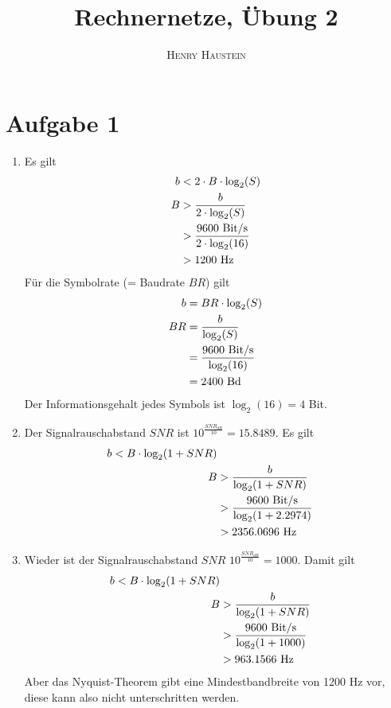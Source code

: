 \documentclass{article}
\title{\textbf{Rechnernetze, Übung 2}}
\author{\textsc{Henry Haustein}}
\date{}
\begin{document}
	\maketitle
	
	\section*{Aufgabe 1}
	\begin{enumerate}[label=(\alph*)]
		\item Es gilt
		\begin{align}
			b &< 2\cdot B\cdot \log_2(S) \notag \\
			B &> \frac{b}{2\cdot\log_2(S)} \notag \\
			&> \frac{9600\text{ Bit/s}}{2\cdot\log_2(16)} \notag \\
			&> 1200 \text{ Hz} \notag
		\end{align}
		Für die Symbolrate (= Baudrate $BR$) gilt
		\begin{align}
			b &= BR\cdot \log_2(S) \notag \\
			BR &= \frac{b}{\log_2(S)} \notag \\
			&= \frac{9600\text{ Bit/s}}{\log_2(16)} \notag \\
			&= 2400 \text{ Bd} \notag
		\end{align}
		Der Informationsgehalt jedes Symbols ist $\log_2(16)=4$ Bit.
		\item Der Signalrauschabstand $SNR$ ist $10^{\frac{SNR_{dB}}{10}} = 15.8489$. Es gilt
		\begin{align}
			b < B\cdot\log_2(1+SNR) \notag \\
			B &> \frac{b}{\log_2(1+SNR)} \notag \\
			&> \frac{9600 \text{ Bit/s}}{\log_2(1+2.2974)} \notag \\
			&> 2356.0696 \text{ Hz} \notag
		\end{align}
		\item Wieder ist der Signalrauschabstand $SNR$ $10^{\frac{SNR_{dB}}{10}} = 1000$. Damit gilt
		\begin{align}
			b < B\cdot\log_2(1+SNR) \notag \\
			B &> \frac{b}{\log_2(1+SNR)} \notag \\
			&> \frac{9600 \text{ Bit/s}}{\log_2(1+1000)} \notag \\
			&> 963.1566 \text{ Hz} \notag
		\end{align}
		Aber das Nyquist-Theorem gibt eine Mindestbandbreite von 1200 Hz vor, diese kann also nicht unterschritten werden.
	\end{enumerate}
\end{document}
